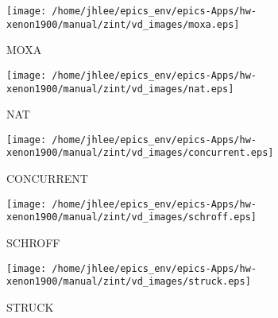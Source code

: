 \noindent
\vspace{1cm}
\begin{minipage}{.2\textwidth}
\begin{center}
\texttt{[image: /home/jhlee/epics\_env/epics-Apps/hw-xenon1900/manual/zint/vd\_images/moxa.eps]}
\end{center}
\end{minipage}
\begin{minipage}{.7\textwidth}
MOXA
\end{minipage}


\noindent
\vspace{1cm}
\begin{minipage}{.2\textwidth}
\begin{center}
\texttt{[image: /home/jhlee/epics\_env/epics-Apps/hw-xenon1900/manual/zint/vd\_images/nat.eps]}
\end{center}
\end{minipage}
\begin{minipage}{.7\textwidth}
NAT
\end{minipage}


\noindent
\vspace{1cm}
\begin{minipage}{.2\textwidth}
\begin{center}
\texttt{[image: /home/jhlee/epics\_env/epics-Apps/hw-xenon1900/manual/zint/vd\_images/concurrent.eps]}
\end{center}
\end{minipage}
\begin{minipage}{.7\textwidth}
CONCURRENT
\end{minipage}


\noindent
\vspace{1cm}
\begin{minipage}{.2\textwidth}
\begin{center}
\texttt{[image: /home/jhlee/epics\_env/epics-Apps/hw-xenon1900/manual/zint/vd\_images/schroff.eps]}
\end{center}
\end{minipage}
\begin{minipage}{.7\textwidth}
SCHROFF
\end{minipage}


\noindent
\vspace{1cm}
\begin{minipage}{.2\textwidth}
\begin{center}
\texttt{[image: /home/jhlee/epics\_env/epics-Apps/hw-xenon1900/manual/zint/vd\_images/struck.eps]}
\end{center}
\end{minipage}
\begin{minipage}{.7\textwidth}
STRUCK
\end{minipage}


